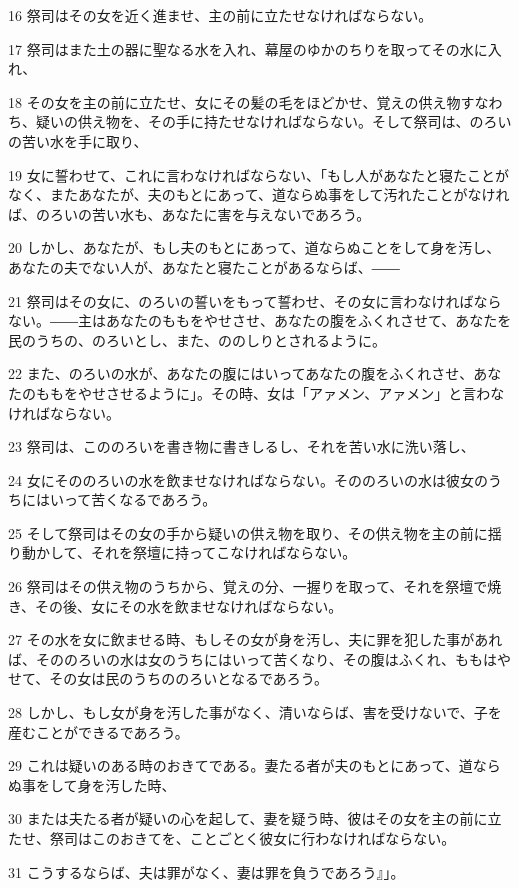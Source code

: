 \par 16 祭司はその女を近く進ませ、主の前に立たせなければならない。
\par 17 祭司はまた土の器に聖なる水を入れ、幕屋のゆかのちりを取ってその水に入れ、
\par 18 その女を主の前に立たせ、女にその髪の毛をほどかせ、覚えの供え物すなわち、疑いの供え物を、その手に持たせなければならない。そして祭司は、のろいの苦い水を手に取り、
\par 19 女に誓わせて、これに言わなければならない、「もし人があなたと寝たことがなく、またあなたが、夫のもとにあって、道ならぬ事をして汚れたことがなければ、のろいの苦い水も、あなたに害を与えないであろう。
\par 20 しかし、あなたが、もし夫のもとにあって、道ならぬことをして身を汚し、あなたの夫でない人が、あなたと寝たことがあるならば、――
\par 21 祭司はその女に、のろいの誓いをもって誓わせ、その女に言わなければならない。――主はあなたのももをやせさせ、あなたの腹をふくれさせて、あなたを民のうちの、のろいとし、また、ののしりとされるように。
\par 22 また、のろいの水が、あなたの腹にはいってあなたの腹をふくれさせ、あなたのももをやせさせるように」。その時、女は「アァメン、アァメン」と言わなければならない。
\par 23 祭司は、こののろいを書き物に書きしるし、それを苦い水に洗い落し、
\par 24 女にそののろいの水を飲ませなければならない。そののろいの水は彼女のうちにはいって苦くなるであろう。
\par 25 そして祭司はその女の手から疑いの供え物を取り、その供え物を主の前に揺り動かして、それを祭壇に持ってこなければならない。
\par 26 祭司はその供え物のうちから、覚えの分、一握りを取って、それを祭壇で焼き、その後、女にその水を飲ませなければならない。
\par 27 その水を女に飲ませる時、もしその女が身を汚し、夫に罪を犯した事があれば、そののろいの水は女のうちにはいって苦くなり、その腹はふくれ、ももはやせて、その女は民のうちののろいとなるであろう。
\par 28 しかし、もし女が身を汚した事がなく、清いならば、害を受けないで、子を産むことができるであろう。
\par 29 これは疑いのある時のおきてである。妻たる者が夫のもとにあって、道ならぬ事をして身を汚した時、
\par 30 または夫たる者が疑いの心を起して、妻を疑う時、彼はその女を主の前に立たせ、祭司はこのおきてを、ことごとく彼女に行わなければならない。
\par 31 こうするならば、夫は罪がなく、妻は罪を負うであろう』」。

